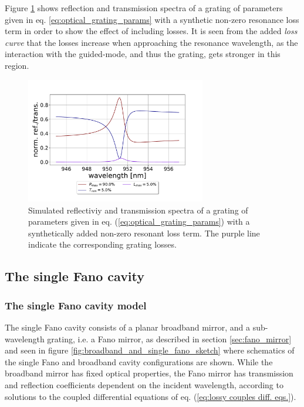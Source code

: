 Figure \ref{fig:lossy_grating_spectrum} shows reflection and transmission spectra of a grating of parameters given in eq. \ref{eq:optical_grating_params} with a synthetic non-zero resonance loss term in order to show the effect of including losses. It is seen from the added \emph{loss curve} that the losses increase when approaching the resonance wavelength, as the interaction with the guided-mode, and thus the grating, gets stronger in this region. 
\begin{figure}[h!]
    \centering
    \includegraphics[width=0.7\textwidth]{figures/arbitrary_lossy_grating_ref_trans.pdf}
    \caption{Simulated reflectiviy and transmission spectra of a grating of parameters given in eq. (\ref{eq:optical_grating_params}) with a synthetically added non-zero resonant loss term. The purple line indicate the corresponding grating losses.}
    \label{fig:lossy_grating_spectrum}
\end{figure}

\subsection{The single Fano cavity}

\subsubsection{The single Fano cavity model}

The single Fano cavity consists of a planar broadband mirror, and a sub-wavelength grating, i.e. a Fano mirror, as described in section \ref{sec:fano_mirror} and seen in figure \ref{fig:broadband_and_single_fano_sketch} where schematics of the single Fano and broadband cavity configurations are shown. While the broadband mirror has fixed optical properties, the Fano mirror has transmission and reflection coefficients dependent on the incident wavelength, according to solutions to the coupled differential equations of eq. (\ref{eq:lossy couples diff. eqs.}). 


